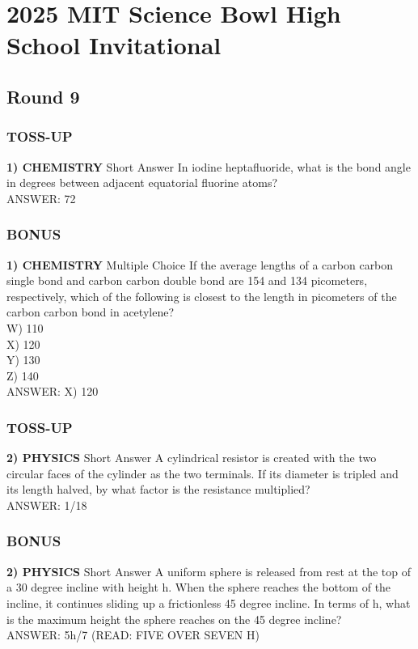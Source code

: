 \section*{2025 MIT Science Bowl High School Invitational}
\subsection*{Round 9}

\subsubsection*{TOSS-UP}
\textbf{1) CHEMISTRY}
Short Answer In iodine heptafluoride, what is the bond angle in degrees between adjacent equatorial fluorine atoms?
\\ANSWER: 72

\subsubsection*{BONUS}
\textbf{1) CHEMISTRY}
Multiple Choice If the average lengths of a carbon carbon single bond and carbon carbon double bond are 154 and 134 picometers, respectively, which of the following is closest to the length in picometers of the carbon carbon bond in acetylene?
\\W) 110
\\X) 120
\\Y) 130
\\Z) 140
\\ANSWER: X) 120

\subsubsection*{TOSS-UP}
\textbf{2) PHYSICS}
Short Answer A cylindrical resistor is created with the two circular faces of the cylinder as the two terminals. If its diameter is tripled and its length halved, by what factor is the resistance multiplied?
\\ANSWER: 1/18

\subsubsection*{BONUS}
\textbf{2) PHYSICS}
Short Answer A uniform sphere is released from rest at the top of a 30 degree incline with height h. When the sphere reaches the bottom of the incline, it continues sliding up a frictionless 45 degree incline. In terms of h, what is the maximum height the sphere reaches on the 45 degree incline?
\\ANSWER: 5h/7 (READ: FIVE OVER SEVEN H)

